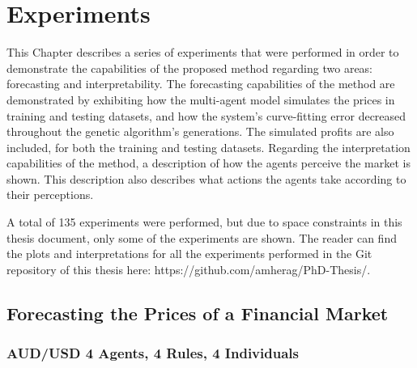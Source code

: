 \chapter{Experiments}
\label{chapter:experiments}


This Chapter describes a series of experiments that were performed in order to
demonstrate the capabilities of the proposed method regarding two areas:
forecasting and interpretability. The forecasting capabilities of the method are
demonstrated by exhibiting how the multi-agent model simulates the prices in
training and testing datasets, and how the system's curve-fitting error
decreased throughout the genetic algorithm's generations. The simulated profits
are also included, for both the training and testing datasets. Regarding the
interpretation capabilities of the method, a description of how the agents
perceive the market is shown. This description also describes what actions the
agents take according to their perceptions.

A total of 135 experiments were performed, but due to space constraints in this
thesis document, only some of the experiments are shown. The reader can find the
plots and interpretations for all the experiments performed in the Git
repository of this thesis here: https://github.com/amherag/PhD-Thesis/.


\section{Forecasting the Prices of a Financial Market}
\label{section:forecasting-the-prices-of-a-financial-market}

\subsection{AUD/USD 4 Agents, 4 Rules, 4 Individuals}
\label{results:forecast-aud-usd-4agents-4rules-4individuals}

